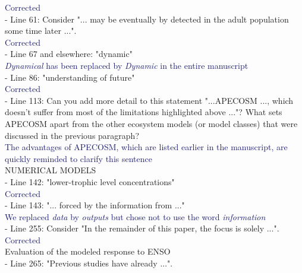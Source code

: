 \documentclass[12pt]{article}
\newcommand{\resp}[1]{\textcolor{MidnightBlue}{#1}}
\begin{document}
\resp{Corrected}\\

- Line 61: Consider "... may be eventually by detected in the adult population some time later ...".\\

\resp{Corrected}   \\

- Line 67 and elsewhere: "dynamic"\\

\resp{\emph{Dynamical} has been replaced by \emph{Dynamic} in the entire manuscript} \\

- Line 86: "understanding of future" \\

\resp{Corrected} \\

- Line 113: Can you add more detail to this statement "...APECOSM ..., which doesn't suffer from most of the limitations highlighted above ..."? What sets APECOSM apart from the other ecosystem models (or model classes) that were discussed in the previous paragraph?\\

\resp{The advantages of APECOSM, which are listed earlier in the manuscript, are quickly reminded to clarify this sentence}\\

NUMERICAL MODELS\\

- Line 142: "lower-trophic level concentrations"\\

\resp{Corrected}\\

- Line 143: "... forced by the information from ..."\\

\resp{We replaced \emph{data} by \emph{outputs} but chose not to use the word \emph{information}}\\

- Line 255: Consider "In the remainder of this paper, the focus is solely ...".\\

\resp{Corrected}\\

Evaluation of the modeled response to ENSO\\

- Line 265: "Previous studies have already ...".\\
\end{document}
